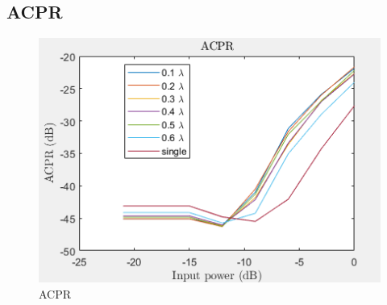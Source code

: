 \subsection{ACPR} %

\begin{figure}[H]
\centering 
\includegraphics[scale = 1]{figures/measurement/two_antenna/ACPR.png}
\caption{ACPR}
\label{fig:acpr_meas}
\end{figure} 


